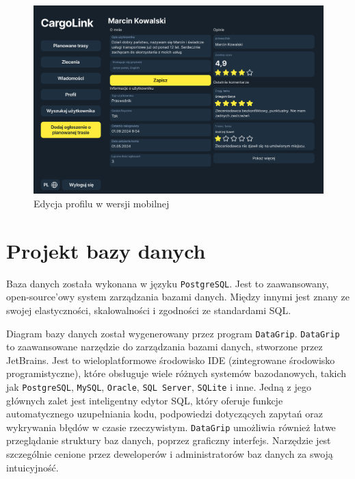 \begin{figure}[H]
	\centering
		\includegraphics[width=0.7\linewidth]{rozdzial1/edytuj_profil_d.jpg}
	\caption{Edycja profilu w wersji mobilnej}
	\label{Edytuj profil - desktop}
\end{figure}


\section{Projekt bazy danych}
Baza danych została wykonana w języku \texttt{PostgreSQL}. Jest to zaawansowany, open-source'owy system zarządzania bazami danych. Między innymi jest znany ze swojej elastyczności, skalowalności i zgodności ze standardami SQL.

Diagram bazy danych został wygenerowany przez program \texttt{DataGrip}. \texttt{DataGrip} to zaawansowane narzędzie do zarządzania bazami danych, stworzone przez JetBrains. Jest to wieloplatformowe środowisko IDE (zintegrowane środowisko programistyczne), które obsługuje wiele różnych systemów bazodanowych, takich jak \texttt{PostgreSQL}, \texttt{MySQL}, \texttt{Oracle}, \texttt{SQL Server}, \texttt{SQLite} i inne. Jedną z jego głównych zalet jest inteligentny edytor SQL, który oferuje funkcje automatycznego uzupełniania kodu, podpowiedzi dotyczących zapytań oraz wykrywania błędów w czasie rzeczywistym. \texttt{DataGrip} umożliwia również łatwe przeglądanie struktury baz danych, poprzez graficzny interfejs. Narzędzie jest szczególnie cenione przez deweloperów i administratorów baz danych za swoją intuicyjność.

